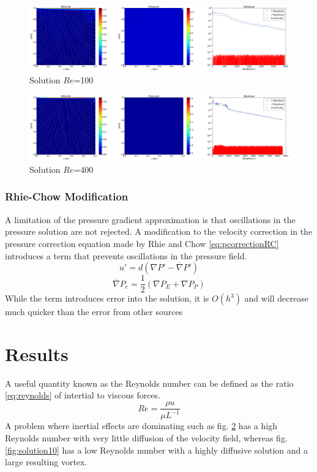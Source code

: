 \documentclass[12pt,twocolumn]{article}
\begin{document}
\begin{figure}
\includegraphics[width=\textwidth]{plot/solution100.png}
\footnotesize{\caption{Solution $Re$=100}\label{fig:solution100}}
\end{figure}
\begin{figure}
\includegraphics[width=\textwidth]{plot/solution400.png}
\footnotesize{\caption{Solution $Re$=400}\label{fig:solution400}}
\end{figure}

\subsubsection*{Rhie-Chow Modification}
A limitation of the pressure gradient approximation is that oscillations in the pressure solution are not rejected.
A modification to the velocity correction in the pressure correction equation made by Rhie and Chow \eqref{eq:pcorrectionRC} introduces a term that prevents oscillations in the pressure field. 
\begin{equation}\label{eq:pcorrectionRC}u' =d(\nabla P' - {\overline\nabla P'})\end{equation}
\[\overline\nabla P_e = \frac{1}{2}\left(\nabla P_E + \nabla P_P\right)\]
While the term introduces error into the solution, it is $O(h^3)$ and will decrease much quicker than the error from other sources

\section*{Results}
A useful quantity known as the Reynolds number can be defined as the ratio \eqref{eq:reynolds} of intertial to viscous forces.
\begin{equation}\label{eq:reynolds}Re = \frac{\rho u}{\mu L^{-1}}\end{equation}
A problem where inertial effects are dominating such as fig. \ref{fig:solution400} has a high Reynolds number with very little diffusion of the velocity field, whereas fig. \ref{fig:solution10} has a low Reynolds number with a highly diffusive solution and a large resulting vortex.
\end{document}
